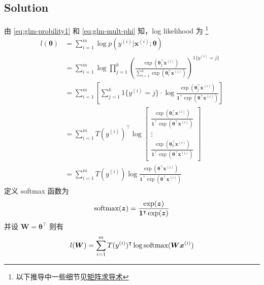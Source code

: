 		\subsection{Solution}
			由 \eqref{eq:glm-probility1} 和 \eqref{eq:glm-mult-phi} 知，log likelihood 为
			\footnote{以下推导中一些细节见\href{https://zhuanlan.zhihu.com/p/24709748}{矩阵求导术}}
			\begin{align*}
				l(\bm{\theta}) &= \sum_{i=1}^{m} \log p(y^{(i)} | \bm{x}^{(i)} ; \bm{\theta} ) \\
				&= \sum_{i=1}^{m} \log \prod_{j=1}^{k} \left( \frac{ \exp(\bm{\theta}_j^\intercal \bm{x}^{(i)}) }{ \sum_{l=1}^{k} \exp \left( \bm{\theta}_l^\intercal \bm{x}^{(i)} \right) } \right)^{1\{y^{(i)}=j\}} \\
				&= \sum_{i=1}^{m} \left[ \sum_{j=1}^{k} 1\{y^{(i)}=j\} \cdot \log \frac {\exp(\bm{\theta}_j^\intercal \bm{x}^{(i)})} {\bm{1}^\intercal \exp(\bm{\theta}^\intercal \bm{x}^{(i)}) } \right] \\
				&= \sum_{i=1}^{m} T(y^{(i)})^\intercal \log
				\begin{bmatrix}
					\frac {\exp(\bm{\theta}_1^\intercal \bm{x}^{(i)})} {\bm{1}^\intercal \exp(\bm{\theta}^\intercal \bm{x}^{(i)}) } \\
					\vdots \\
					\frac {\exp(\bm{\theta}_k^\intercal \bm{x}^{(i)})} {\bm{1}^\intercal \exp(\bm{\theta}^\intercal \bm{x}^{(i)}) }
				\end{bmatrix} \\
				&= \sum_{i=1}^{m} T(y^{(i)}) \log \frac {\exp(\bm{\theta}^\intercal \bm{x}^{(i)})} {\bm{1}^\intercal \exp(\bm{\theta}^\intercal \bm{x}^{(i)}) } 
			\end{align*}
			定义 softmax 函数为
			\begin{equation}
				\text{softmax}(\bm{z}) = \frac {\exp(\bm{z})} {\bm{1}^\intercal \exp(\bm{z}) } 
			\end{equation}
			并设 $ \bm{W} = \bm{\theta}^\intercal $ 则有
			\begin{equation}
				l(\bm{W}) = \sum_{i=1}^{m} T(y^{(i)})^\intercal \log \text{softmax}(\bm{W} \bm{x}^{(i)})
			\end{equation}
			
